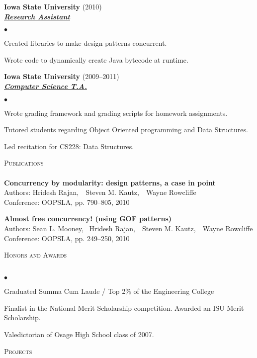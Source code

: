 \documentclass{article}
\newcommand{\lineunder} {
	\vspace*{-8pt} \\ \hspace*{-18pt} \hrulefill \\
}
\newcommand{\header}[1] {
	{\hspace*{-15pt}\vspace*{6pt} \textsc{#1}} \vspace*{-6pt} \lineunder
}
\newcommand{\employer}[3] {
	{ \textbf{#1} (#2)\\ \underline{\textbf{\emph{#3}}}\\  }
}
\newcommand{\paper}[5] {
	{\textbf{#1}\\ \hspace*{15pt}Authors: #2\\ \hspace*{15pt}#3, #4, #5\\ \vspace*{8pt}}
}
\newenvironment{achievements} {
	\begin{list}{$\bullet$}
		{\topsep 0pt \itemsep -2pt}
	}{
		\vspace*{4pt}\end{list}
	}
\begin{document}
	\employer{Iowa State University}{2010}{Research Assistant}
		\begin{achievements}
			\item{Created libraries to make design patterns concurrent.}
			\item{Wrote code to dynamically create Java bytecode at runtime.}
		\end{achievements}

	\employer{Iowa State University}{2009--2011}{Computer Science T.A.}
		\begin{achievements}
			\item{Wrote grading framework and grading scripts for homework assignments.}
			\item{Tutored students regarding Object Oriented programming and Data Structures.}
			\item{Led recitation for CS228: Data Structures.}
		\end{achievements}

\header{Publications}

	\paper{Concurrency by modularity: design patterns, a case in point}{Hridesh Rajan,~ Steven M. Kautz,~ Wayne Rowcliffe}
		{Conference: OOPSLA}{pp. 790--805}{2010}
	\paper{Almost free concurrency! (using GOF patterns)}{Sean L. Mooney,~ Hridesh Rajan,~ Steven M. Kautz,~ Wayne Rowcliffe}
		{Conference: OOPSLA}{pp. 249--250}{2010}


\header{Honors and Awards}

	\begin{achievements}
		\item{Graduated Summa Cum Laude / Top 2\% of the Engineering College}
		\item{Finalist in the National Merit Scholarship competition. Awarded an ISU Merit Scholarship.}
		\item{Valedictorian of Osage High School class of 2007.}
	\end{achievements}

\header{Projects}
\end{document}

